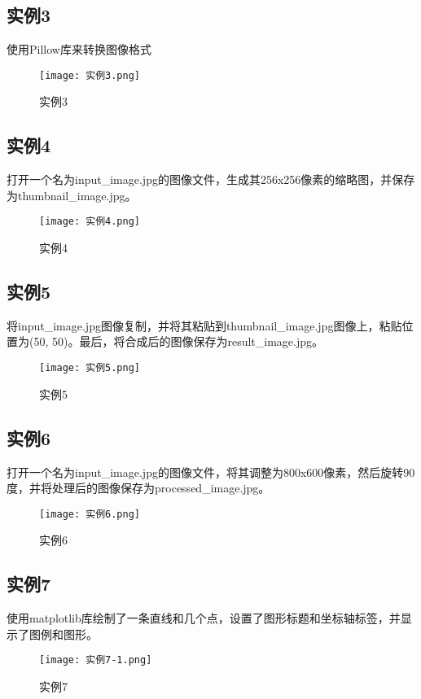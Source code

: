 \documentclass[a4paper, 12pt]{article}
\begin{document}
\subsection{实例3}
使用Pillow库来转换图像格式

\begin{figure}[h!]
  \centering
  \texttt{[image: 实例3.png]}
  \caption{实例3}
\end{figure}

\subsection{实例4}
打开一个名为input\_image.jpg的图像文件，生成其256x256像素的缩略图，并保存为thumbnail\_image.jpg。

\begin{figure}[h!]
  \centering
  \texttt{[image: 实例4.png]}
  \caption{实例4}
\end{figure}

\subsection{实例5}
将input\_image.jpg图像复制，并将其粘贴到thumbnail\_image.jpg图像上，粘贴位置为(50, 50)。最后，将合成后的图像保存为result\_image.jpg。

\begin{figure}[h!]
  \centering
  \texttt{[image: 实例5.png]}
  \caption{实例5}
\end{figure}

\subsection{实例6}
打开一个名为input\_image.jpg的图像文件，将其调整为800x600像素，然后旋转90度，并将处理后的图像保存为processed\_image.jpg。

\begin{figure}[h!]
  \centering
  \texttt{[image: 实例6.png]}
  \caption{实例6}
\end{figure}

\subsection{实例7}
使用matplotlib库绘制了一条直线和几个点，设置了图形标题和坐标轴标签，并显示了图例和图形。

\begin{figure}[h!]
  \centering
  \texttt{[image: 实例7-1.png]}
  \caption{实例7}
\end{figure}
\end{document}
